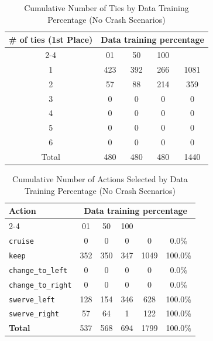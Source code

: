 \documentclass{article}
\begin{document}
\begin{table}[h]
\centering
\caption{Cumulative Number of Ties by Data Training Percentage (No Crash Scenarios)}
\begin{tabular}{c|ccc|c}
\toprule
\multirow{2}{*}{\# of ties (1st Place)} & \multicolumn{5}{c|}{Data training percentage} & \multirow{2}{*}{Total} \\
\cmidrule{2-4}
 & 01 & 50 & 100 & \\
\midrule
1 & 423 & 392 & 266 & 1081 \\ 
2 & 57 & 88 & 214 & 359 \\ 
3 & 0 & 0 & 0 & 0 \\ 
4 & 0 & 0 & 0 & 0 \\ 
5 & 0 & 0 & 0 & 0 \\ 
6 & 0 & 0 & 0 & 0 \\ 
\midrule
Total & 480 & 480 & 480 & 1440 \\ 
\bottomrule
\end{tabular}
\end{table}

\begin{table}[h]
\centering
\caption{Cumulative Number of Actions Selected by Data Training Percentage (No Crash Scenarios)}
\begin{tabular}{l|ccc|c|c}
\toprule
\multirow{2}{*}{Action} & \multicolumn{5}{c|}{Data training percentage} & \multirow{2}{*}{Total} & \multirow{2}{*}{Safe (\%)} \\
\cmidrule{2-4}
 & 01 & 50  & 100 & & \\
\midrule
\texttt{cruise} & 0 & 0 & 0 & 0 & 0.0\% \\ 
\texttt{keep} & 352 & 350 & 347 & 1049 & 100.0\% \\ 
\texttt{change\_to\_left} & 0 & 0 & 0 & 0 & 0.0\% \\ 
\texttt{change\_to\_right} & 0 & 0 & 0 & 0 & 0.0\% \\ 
\texttt{swerve\_left} & 128 & 154 & 346 & 628 & 100.0\% \\ 
\texttt{swerve\_right} & 57 & 64 & 1 & 122 & 100.0\% \\ 
\midrule
\textbf{Total} & 537 & 568 & 694 & 1799 & 100.0\% \\ 
\bottomrule
\end{tabular}
\end{table}
\end{document}
